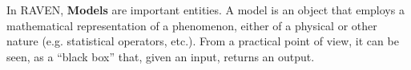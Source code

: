 \newcommand{\betaAMLPDescription}[1]
{
  \xmlNode{beta\_1}, \xmlDesc{float, optional field}, exponential decay rate for estimates of first moment
  vector in adam. should be in [0, 1). only used when solver = `adam'
  \ifthenelse{\equal{#1}{}}{}{\default{#1}}
}
\newcommand{\betaBMLPDescription}[1]
{
  \xmlNode{beta\_2}, \xmlDesc{float, optional field}, exponential decay rate for estimates of second moment
  vector in adam. should be in [0, 1). only used when solver = `adam'
  \ifthenelse{\equal{#1}{}}{}{\default{#1}}
}



In RAVEN, \textbf{Models} are important entities.
%
A model is an object that employs a mathematical representation of a
phenomenon, either of a physical or other nature (e.g. statistical operators,
etc.).
%
From a practical point of view, it can be seen, as a ``black box'' that, given
an input, returns an output.
%

